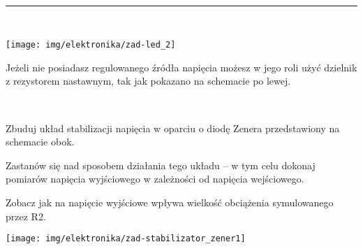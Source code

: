 \hfill \rule{0.8\textwidth}{.3pt}\hfill 

\noindent\begin{minipage}[b]{0.27\textwidth}
\texttt{[image: img/elektronika/zad-led\_2]}
\end{minipage}
\hfill
\begin{minipage}[b]{0.6\textwidth}
Jeżeli nie posiadasz regulowanego źródła napięcia możesz w jego roli użyć dzielnik z rezystorem nastawnym, tak jak pokazano na schemacie po lewej.
\vspace{1.3cm}
\end{minipage}
\hfill 
\fi


\dbEntryCheckResults
\noindent\begin{minipage}[b]{0.77\textwidth}
Zbuduj układ stabilizacji napięcia w oparciu o diodę Zenera przedstawiony na schemacie obok.

Zastanów się nad sposobem działania tego układu – w tym celu dokonaj pomiarów napięcia wyjściowego w zależności od napięcia wejściowego.

Zobacz jak na napięcie wyjściowe wpływa wielkość obciążenia symulowanego przez R2.
\vspace{13pt}
\end{minipage}
\hfill
\begin{minipage}[b]{0.17\textwidth}
\texttt{[image: img/elektronika/zad-stabilizator\_zener1]}
\end{minipage}
\fi

